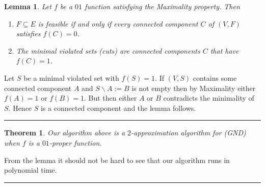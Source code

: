 \documentclass[letterpaper,12pt,oneside,onecolumn]{article}
\newenvironment{proof}{{\bf Proof:  }}{\hfill\rule{2mm}{2mm}}
\newtheorem{lemma}[fact]{Lemma}
\newtheorem{theorem}[fact]{Theorem}
\begin{document}
\begin{lemma}
Let $f$ be a $01$ function satisfying the Maximality property. Then
\begin{enumerate}
\item $F \subseteq E$ is feasible if and only if every connected component $C$ of $(V,F)$ satisfies $f(C) = 0$.
\item The minimal violated sets (cuts) are connected components $C$ that have $f(C) = 1$.
\end{enumerate}
\end{lemma}
\begin{proof}
Let $S$ be a minimal violated set with $f(S) = 1$. If $(V,S)$ contains some connected component $A$ and $S\backslash A := B$ is not empty then by Maximality either $f(A) = 1$ or $f(B) = 1$. But then either $A$ or $B$ contradicts the minimality of $S$. Hence $S$ is a connected component and the lemma follows.
\end{proof}
\begin{theorem}
Our algorithm above is a $2$-approximation algorithm for (GND) when $f$ is a $01$-proper function.
\end{theorem}
\begin{proof}
From the lemma it should not be hard to see that our algorithm runs in polynomial time.
\end{proof}
\end{document}
